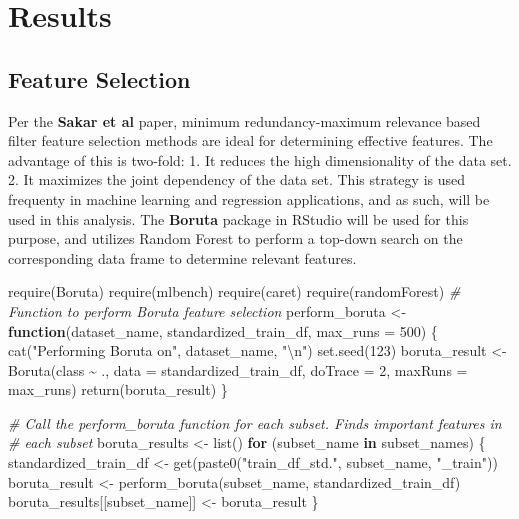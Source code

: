 \documentclass[
]{article}
\newenvironment{Shaded}{\begin{snugshade}}{\end{snugshade}}
\newcommand{\AttributeTok}[1]{\textcolor[rgb]{0.77,0.63,0.00}{#1}}
\newcommand{\CommentTok}[1]{\textcolor[rgb]{0.56,0.35,0.01}{\textit{#1}}}
\newcommand{\ControlFlowTok}[1]{\textcolor[rgb]{0.13,0.29,0.53}{\textbf{#1}}}
\newcommand{\DecValTok}[1]{\textcolor[rgb]{0.00,0.00,0.81}{#1}}
\newcommand{\FunctionTok}[1]{\textcolor[rgb]{0.00,0.00,0.00}{#1}}
\newcommand{\NormalTok}[1]{#1}
\newcommand{\OtherTok}[1]{\textcolor[rgb]{0.56,0.35,0.01}{#1}}
\newcommand{\SpecialCharTok}[1]{\textcolor[rgb]{0.00,0.00,0.00}{#1}}
\newcommand{\StringTok}[1]{\textcolor[rgb]{0.31,0.60,0.02}{#1}}
\begin{document}
\newpage

\hypertarget{results}{%
\section{Results}\label{results}}

\hypertarget{feature-selection}{%
\subsection{Feature Selection}\label{feature-selection}}

Per the \textbf{Sakar et al} paper, minimum redundancy-maximum relevance based filter feature selection methods are ideal for determining effective features. The advantage of this is two-fold:
1. It reduces the high dimensionality of the data set.
2. It maximizes the joint dependency of the data set.
This strategy is used frequenty in machine learning and regression applications, and as such, will be used in this analysis. The \textbf{Boruta} package in RStudio will be used for this purpose, and utilizes Random Forest to perform a top-down search on the corresponding data frame to determine relevant features.

\begin{Shaded}
\begin{Highlighting}[]
\FunctionTok{require}\NormalTok{(Boruta)}
\FunctionTok{require}\NormalTok{(mlbench)}
\FunctionTok{require}\NormalTok{(caret)}
\FunctionTok{require}\NormalTok{(randomForest)}
\CommentTok{\# Function to perform Boruta feature selection}
\NormalTok{perform\_boruta }\OtherTok{\textless{}{-}} \ControlFlowTok{function}\NormalTok{(dataset\_name, standardized\_train\_df, }\AttributeTok{max\_runs =} \DecValTok{500}\NormalTok{) \{}
    \FunctionTok{cat}\NormalTok{(}\StringTok{"Performing Boruta on"}\NormalTok{, dataset\_name, }\StringTok{"}\SpecialCharTok{\textbackslash{}n}\StringTok{"}\NormalTok{)}
    \FunctionTok{set.seed}\NormalTok{(}\DecValTok{123}\NormalTok{)}
\NormalTok{    boruta\_result }\OtherTok{\textless{}{-}} \FunctionTok{Boruta}\NormalTok{(class }\SpecialCharTok{\textasciitilde{}}\NormalTok{ ., }\AttributeTok{data =}\NormalTok{ standardized\_train\_df, }\AttributeTok{doTrace =} \DecValTok{2}\NormalTok{,}
        \AttributeTok{maxRuns =}\NormalTok{ max\_runs)}
    \FunctionTok{return}\NormalTok{(boruta\_result)}
\NormalTok{\}}

\CommentTok{\# Call the perform\_boruta function for each subset. Finds important features in}
\CommentTok{\# each subset}
\NormalTok{boruta\_results }\OtherTok{\textless{}{-}} \FunctionTok{list}\NormalTok{()}
\ControlFlowTok{for}\NormalTok{ (subset\_name }\ControlFlowTok{in}\NormalTok{ subset\_names) \{}
\NormalTok{    standardized\_train\_df }\OtherTok{\textless{}{-}} \FunctionTok{get}\NormalTok{(}\FunctionTok{paste0}\NormalTok{(}\StringTok{"train\_df\_std."}\NormalTok{, subset\_name, }\StringTok{"\_train"}\NormalTok{))}
\NormalTok{    boruta\_result }\OtherTok{\textless{}{-}} \FunctionTok{perform\_boruta}\NormalTok{(subset\_name, standardized\_train\_df)}
\NormalTok{    boruta\_results[[subset\_name]] }\OtherTok{\textless{}{-}}\NormalTok{ boruta\_result}
\NormalTok{\}}
\end{Highlighting}
\end{Shaded}
\end{document}
